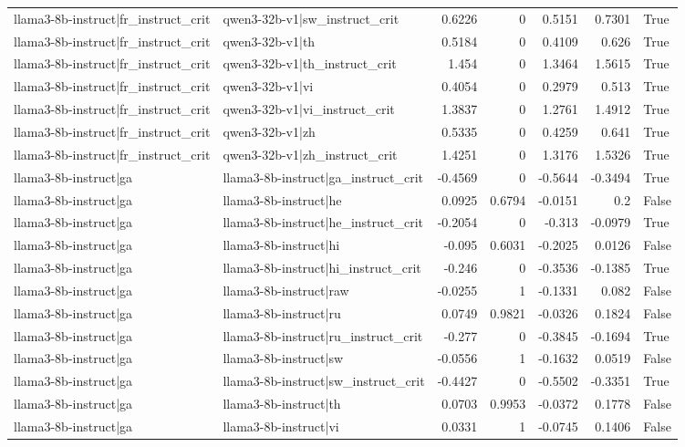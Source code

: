 \begin{table}
\begin{tabular}{l l r r r r l}
llama3-8b-instruct|fr_instruct_crit & qwen3-32b-v1|sw_instruct_crit & 0.6226 & 0 & 0.5151 & 0.7301 & True \\
llama3-8b-instruct|fr_instruct_crit & qwen3-32b-v1|th & 0.5184 & 0 & 0.4109 & 0.626 & True \\
llama3-8b-instruct|fr_instruct_crit & qwen3-32b-v1|th_instruct_crit & 1.454 & 0 & 1.3464 & 1.5615 & True \\
llama3-8b-instruct|fr_instruct_crit & qwen3-32b-v1|vi & 0.4054 & 0 & 0.2979 & 0.513 & True \\
llama3-8b-instruct|fr_instruct_crit & qwen3-32b-v1|vi_instruct_crit & 1.3837 & 0 & 1.2761 & 1.4912 & True \\
llama3-8b-instruct|fr_instruct_crit & qwen3-32b-v1|zh & 0.5335 & 0 & 0.4259 & 0.641 & True \\
llama3-8b-instruct|fr_instruct_crit & qwen3-32b-v1|zh_instruct_crit & 1.4251 & 0 & 1.3176 & 1.5326 & True \\
llama3-8b-instruct|ga & llama3-8b-instruct|ga_instruct_crit & -0.4569 & 0 & -0.5644 & -0.3494 & True \\
llama3-8b-instruct|ga & llama3-8b-instruct|he & 0.0925 & 0.6794 & -0.0151 & 0.2 & False \\
llama3-8b-instruct|ga & llama3-8b-instruct|he_instruct_crit & -0.2054 & 0 & -0.313 & -0.0979 & True \\
llama3-8b-instruct|ga & llama3-8b-instruct|hi & -0.095 & 0.6031 & -0.2025 & 0.0126 & False \\
llama3-8b-instruct|ga & llama3-8b-instruct|hi_instruct_crit & -0.246 & 0 & -0.3536 & -0.1385 & True \\
llama3-8b-instruct|ga & llama3-8b-instruct|raw & -0.0255 & 1 & -0.1331 & 0.082 & False \\
llama3-8b-instruct|ga & llama3-8b-instruct|ru & 0.0749 & 0.9821 & -0.0326 & 0.1824 & False \\
llama3-8b-instruct|ga & llama3-8b-instruct|ru_instruct_crit & -0.277 & 0 & -0.3845 & -0.1694 & True \\
llama3-8b-instruct|ga & llama3-8b-instruct|sw & -0.0556 & 1 & -0.1632 & 0.0519 & False \\
llama3-8b-instruct|ga & llama3-8b-instruct|sw_instruct_crit & -0.4427 & 0 & -0.5502 & -0.3351 & True \\
llama3-8b-instruct|ga & llama3-8b-instruct|th & 0.0703 & 0.9953 & -0.0372 & 0.1778 & False \\
llama3-8b-instruct|ga & llama3-8b-instruct|vi & 0.0331 & 1 & -0.0745 & 0.1406 & False \\

\end{tabular}
\end{table}
